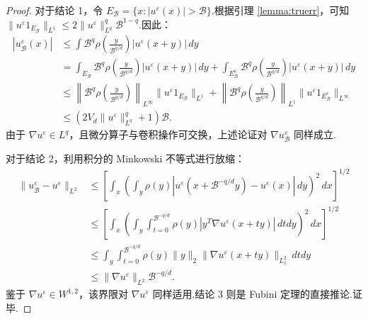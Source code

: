 \begin{proof}
对于结论 1，令 $E_{\mathcal{B}}=\{x:|u^{\varepsilon}(x)|>\mathcal{B}\}$.根据引理 \ref{lemma:truerr}，可知 $\|u^{\varepsilon}1_{E_{\mathcal{B}}}\|_{L^{1}}\leq 2\|u^{\varepsilon}\|_{L^{q}}^{q}\mathcal{B}^{1-q}$.因此：
\begin{equation*}
\begin{aligned}
|u^{\varepsilon}_{\mathcal{B}}(x)|&\leq \int \mathcal{B}^{q}\rho\left(\frac{y}{\mathcal{B}^{q/d}}\right)|u^{\varepsilon}(x+y)|\,dy\\
&= \int_{E_{\mathcal{B}}}\mathcal{B}^{q}\rho\left(\frac{y}{\mathcal{B}^{q/d}}\right)|u^{\varepsilon}(x+y)|\,dy+\int_{E_{\mathcal{B}}^{c}}\mathcal{B}^{q}\rho\left(\frac{y}{\mathcal{B}^{q/d}}\right)|u^{\varepsilon}(x+y)|\,dy\\
&\leq \left\|\mathcal{B}^{q}\rho\left(\frac{y}{\mathcal{B}^{q/d}}\right)\right\|_{L^{\infty}}\|u^{\varepsilon}1_{E_{\mathcal{B}}}\|_{L^{1}}+\left\|\mathcal{B}^{q}\rho\left(\frac{y}{\mathcal{B}^{q/d}}\right)\right\|_{L^{1}}\|u^{\varepsilon}1_{E_{\mathcal{B}}^{c}}\|_{L^{\infty}}\\
&\leq \left(2V_{d}\|u^{\varepsilon}\|_{L^{q}}^{q}+1\right)\mathcal{B}.
\end{aligned}
\end{equation*}
由于 $\nabla u^{\varepsilon}\in L^{q}$，且微分算子与卷积操作可交换，上述论证对 $\nabla u^{\varepsilon}_{\mathcal{B}}$ 同样成立.

对于结论 2，利用积分的 Minkowski 不等式进行放缩：
\begin{equation*}
\begin{aligned}
\|u^{\varepsilon}_{\mathcal{B}}-u^{\varepsilon}\|_{L^{2}}&\leq \left[\int_{x}\left(\int_{y}\rho(y)\left|u^{\varepsilon}(x+\mathcal{B}^{-q/d}y)-u^{\varepsilon}(x)\right|\,dy\right)^{2}\,dx\right]^{1/2}\\
&\leq \left[\int_{x}\left(\int_{y}\int_{t=0}^{\mathcal{B}^{-q/d}}\rho(y)\left|y^{T}\nabla u^{\varepsilon}(x+ty)\right|\,dtdy\right)^{2}\,dx\right]^{1/2}\\
&\leq \int_{y}\int_{t=0}^{\mathcal{B}^{-q/d}}\rho(y)\|y\|_{2}\|\nabla u^{\varepsilon}(x+ty)\|_{L_{x}^{2}}\,dtdy\\
&\leq \|\nabla u^{\varepsilon}\|_{L^{2}}\mathcal{B}^{-q/d}.
\end{aligned}
\end{equation*}
鉴于 $\nabla u^{\varepsilon}\in W^{1,2}$，该界限对 $\nabla u^{\varepsilon}$ 同样适用.结论 3 则是 Fubini 定理的直接推论.证毕.
\end{proof}


